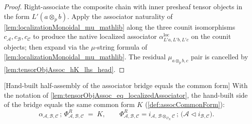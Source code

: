 \begin{proof}
  Right-associate the composite chain with inner presheaf tensor objects in the form \(L'(a\otimes_p b)\).
  Apply the associator naturality of \cref{lem:localizationMonoidal_mu_mathlib} along the three counit
  isomorphisms \(c_{\mathcal{A}}, c_{\mathcal{B}}, c_{\mathcal{C}}\) to produce the native localized
  associator \(\alpha^{\mathrm{loc}}_{L'a,L'b,L'c}\) on the counit objects; then expand via the
  \(\mu\)-string formula of \cref{lem:localizationMonoidal_mu_mathlib}. The residual
  \(\mu_{a\otimes_p b,c}\) pair is cancelled by \cref{lem:tensorObjAssoc_hK_lhs_head}.
\end{proof}

\begin{lemma}



[Hand-built half-assembly of the associator bridge equals the common form]
  \label{lem:tensorObjAssoc_hK_rhs}
  With the notation of \cref{lem:tensorObjAssoc_eq_localizedAssociator}, the
  hand-built side of the bridge equals the same common form \(K\)
  (\cref{def:assocCommonForm}):
  \[
    \alpha_{\mathcal{A},\mathcal{B},\mathcal{C}} \,;\,
      \Phi^{R}_{\mathcal{A},\mathcal{B},\mathcal{C}}
    \;=\; K,
    \qquad
    \Phi^{R}_{\mathcal{A},\mathcal{B},\mathcal{C}}
      = i_{\mathcal{A},\,\mathcal{B} \otimes_{\mathcal{O}_X} \mathcal{C}}
        \,;\, \bigl(\mathcal{A} \lhd i_{\mathcal{B},\mathcal{C}}\bigr).
  \]
\end{lemma}


